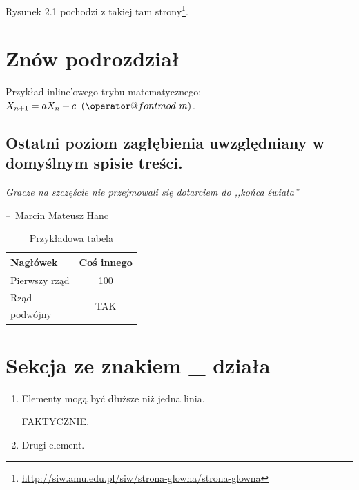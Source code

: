 \documentclass[12pt,a4paper,leqno,oneside,titlepage]{book}
\makeatletter
\def\imod#1{\allowbreak\mkern10mu({\operator@font mod}\,\,#1)}
\newenvironment{chapquote}[2][2em]
  {\setlength{\@tempdima}{#1}%
   \def\chapquote@author{#2}%
   \parshape 1 \@tempdima \dimexpr\textwidth-2\@tempdima\relax%
   \itshape}
  {\par\normalfont\hfill--\ \chapquote@author\hspace*{\@tempdima}\par\bigskip}
\makeatother
\begin{document}
Rysunek 2.1 pochodzi z takiej tam strony\footnote{\url{http://siw.amu.edu.pl/siw/strona-glowna/strona-glowna}}.

\section{Znów podrozdział}

Przykład inline'owego trybu matematycznego: $X_{n+1} = a X_n + c \imod{m}$.

\subsection{Ostatni poziom zagłębienia uwzględniany w domyślnym spisie treści.}

\begin{chapquote}{Marcin Mateusz Hanc}
Gracze na szczęście nie przejmowali się dotarciem do ,,końca świata'' \cite{Hanc15szumy}
\end{chapquote}

\begin{table}[h]
\centering
\label{tab:RNG_examples}
\begin{tabular}{l|c}
 Nagłówek & Coś innego \\
 \hline \hline
 Pierwszy rząd & 100 \\
 \hline
 Rząd & \multirow{2}{*}{TAK} \\
 podwójny & \\
\end{tabular}
\caption{Przykładowa tabela}
\end{table}



\section{Sekcja ze znakiem \_ działa}

\begin{enumerate}
\item Elementy mogą być dłuższe niż jedna linia.

FAKTYCZNIE.

\item Drugi element.

\end{enumerate}
\end{document}
